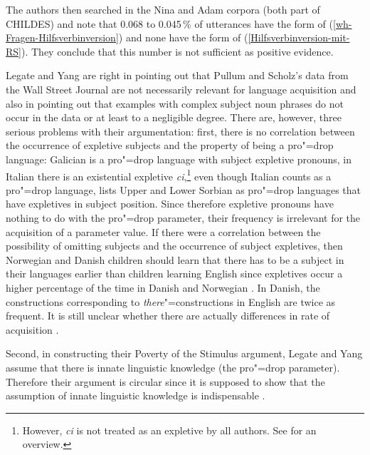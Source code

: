 The authors then searched in the Nina and Adam corpora (both part of CHILDES) and note that 0.068 to 0.045\,\% of utterances have the form of
(\ref{wh-Fragen-Hilfsverbinversion}) and none have the form of (\ref{Hilfsverbinversion-mit-RS}). They conclude that this number is not sufficient as positive evidence.

Legate and Yang are right in pointing out that Pullum and Scholz's data from the Wall Street Journal are not necessarily relevant for language acquisition and also in pointing
out that examples with complex subject noun phrases do not occur in the data or at least to a
negligible degree. There are, however, three serious problems with their argumentation: first, there
is no correlation between the occurrence of expletive subjects and the property of being a pro"=drop
language: Galician \citep[Section~2.5]{RU90a-u} is a pro"=drop language with subject
expletive pronouns, in Italian there is an existential expletive \emph{ci},\footnote{%
	However, \emph{ci} is not treated as an expletive by all authors. See  for an overview.
} even though Italian counts as a pro"=drop language, \citet{Franks95a-u} lists Upper and Lower Sorbian as pro"=drop languages
 that have expletives in subject position.
Since therefore expletive pronouns have nothing to do with the pro"=drop parameter, their frequency is irrelevant for the acquisition of a parameter value. If there were a correlation
between the possibility of omitting subjects and the occurrence of subject expletives, then Norwegian and Danish children should learn that there has to be a subject
in their languages earlier than children learning English since expletives occur a higher percentage of the time in Danish and Norwegian \citep[]{SP2002b}.
In Danish, the constructions corresponding to \emph{there}"=constructions in English are twice as frequent. It is still unclear whether there are actually differences in
rate of acquisition \citep[]{Pullum2009a}.

Second, in constructing their Poverty of the Stimulus argument, Legate and Yang assume that there is innate linguistic knowledge (the pro"=drop parameter).
Therefore their argument is circular since it is supposed to show that the assumption of innate linguistic knowledge is indispensable \citep[]{SP2002b}. 

